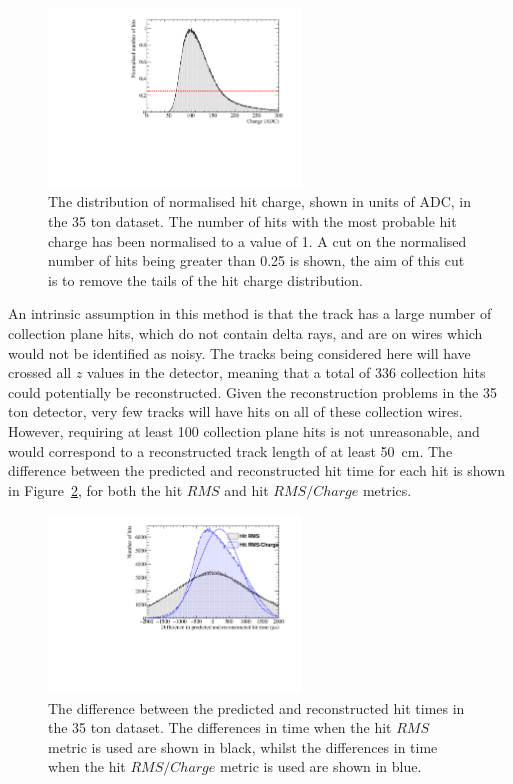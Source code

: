 \begin{figure}
  \centering
  \includegraphics[width=0.6\textwidth]{ChargeCutData}
  \caption[The distribution of normalised hit charge in the 35 ton dataset]
          {The distribution of normalised hit charge, shown in units of ADC, in the 35 ton dataset. The number of hits with the most probable hit charge has been normalised to a value of 1. A cut on the normalised number of hits being greater than 0.25 is shown, the aim of this cut is to remove the tails of the hit charge distribution.}
  \label{fig:DiffData_ChargeCut}
\end{figure}

An intrinsic assumption in this method is that the track has a large number of collection plane hits, which do not contain delta rays, and are on wires which would not be identified as noisy. The tracks being considered here will have crossed all $z$ values in the detector, meaning that a total of 336 collection hits could potentially be reconstructed. Given the reconstruction problems in the 35 ton detector, very few tracks will have hits on all of these collection wires. However, requiring at least 100 collection plane hits is not unreasonable, and would correspond to a reconstructed track length of at least 50~cm. The difference between the predicted and reconstructed hit time for each hit is shown in Figure~\ref{fig:DiffDataPredHit}, for both the hit $RMS$ and hit $RMS/Charge$ metrics. \\

\begin{figure}
  \centering
  \includegraphics[width=0.6\textwidth]{DifferenceInteractionTime_Data}
  \caption[The difference between the predicted and reconstructed hit times in the 35 ton dataset]
          {The difference between the predicted and reconstructed hit times in the 35 ton dataset. The differences in time when the hit $RMS$ metric is used are shown in black, whilst the differences in time when the hit $RMS/Charge$ metric is used are shown in blue.}
  \label{fig:DiffDataPredHit}
\end{figure}

